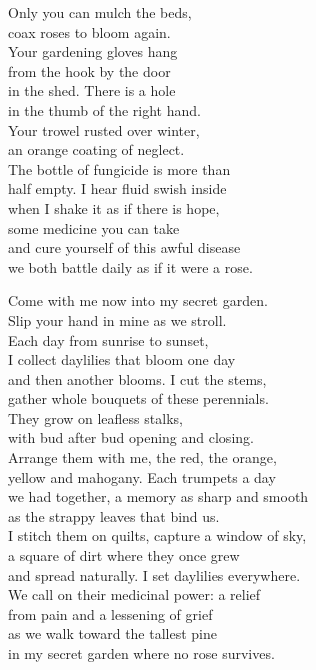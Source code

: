 \documentclass[twoside,10pt]{book}
\begin{document}
Only you can mulch the beds,\\
coax roses to bloom again.\\
Your gardening gloves hang\\
from the hook by the door\\
in the shed. There is a hole\\
in the thumb of the right hand.\\
Your trowel rusted over winter,\\
an orange coating of neglect.\\
The bottle of fungicide is more than\\
half empty. I hear fluid swish inside\\
when I shake it as if there is hope,\\
some medicine you can take\\
and cure yourself of this awful disease\\
we both battle daily as if it were a rose.

Come with me now into my secret garden.\\
Slip your hand in mine as we stroll.\\
Each day from sunrise to sunset,\\
I collect daylilies that bloom one day\\
and then another blooms. I cut the stems,\\
gather whole bouquets of these perennials.\\
They grow on leafless stalks,\\
with bud after bud opening and closing.\\
Arrange them with me, the red, the orange,\\
yellow and mahogany. Each trumpets a day\\
we had together, a memory as sharp and smooth\\
as the strappy leaves that bind us.\\
I stitch them on quilts, capture a window of sky,\\
a square of dirt where they once grew\\
and spread naturally. I set daylilies everywhere.\\
We call on their medicinal power: a relief\\
from pain and a lessening of grief\\
as we walk toward the tallest pine\\
in my secret garden where no rose survives.
\end{document}
